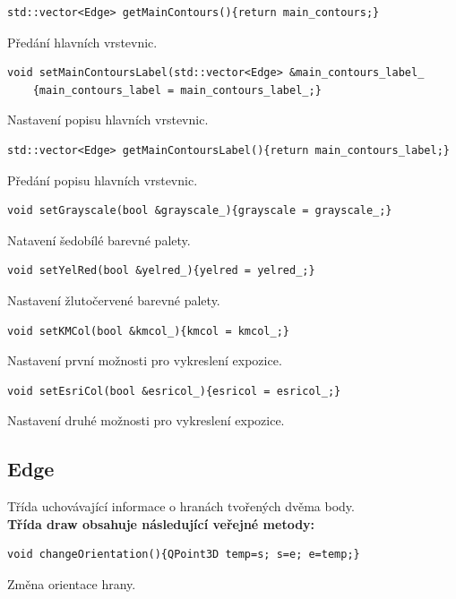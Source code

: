 \documentclass[a4paper, 12pt, oneside, titlepage]{article} %
\begin{document}
\begin{verbatim}
std::vector<Edge> getMainContours(){return main_contours;}
\end{verbatim}
Předání hlavních vrstevnic.\\

\begin{verbatim}
void setMainContoursLabel(std::vector<Edge> &main_contours_label_
    {main_contours_label = main_contours_label_;}
\end{verbatim}
Nastavení popisu hlavních vrstevnic.\\

\begin{verbatim}
std::vector<Edge> getMainContoursLabel(){return main_contours_label;}
\end{verbatim}
Předání popisu hlavních vrstevnic.\\

\begin{verbatim}
void setGrayscale(bool &grayscale_){grayscale = grayscale_;}
\end{verbatim}
Natavení šedobílé barevné palety.\\

\begin{verbatim}
void setYelRed(bool &yelred_){yelred = yelred_;}
\end{verbatim}
Nastavení žlutočervené barevné palety.\\

\begin{verbatim}
void setKMCol(bool &kmcol_){kmcol = kmcol_;}
\end{verbatim}
Nastavení první možnosti pro vykreslení expozice.\\

\begin{verbatim}
void setEsriCol(bool &esricol_){esricol = esricol_;}
\end{verbatim}
Nastavení druhé možnosti pro vykreslení expozice.\\

\subsection{Edge}
Třída uchovávající informace o hranách tvořených dvěma body.\\
\textbf{Třída draw obsahuje následující veřejné metody:}
\begin{verbatim}
void changeOrientation(){QPoint3D temp=s; s=e; e=temp;}
\end{verbatim}
Změna orientace hrany.\\
\end{document}

